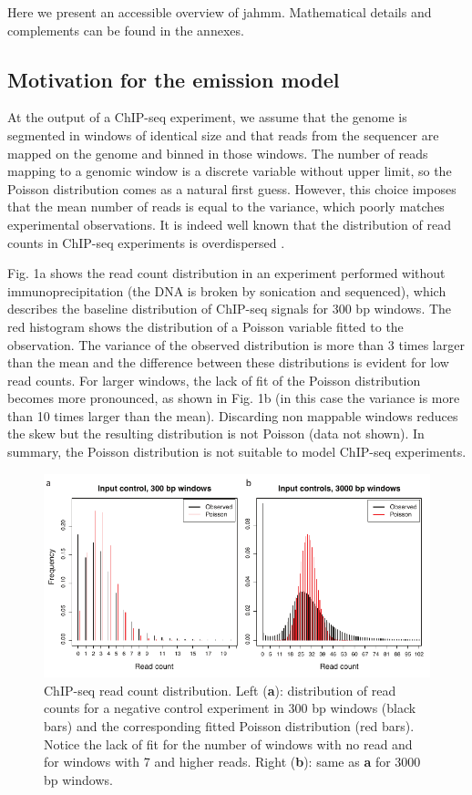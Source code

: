 \documentclass[12pt]{article}
\begin{document}
Here we present an accessible overview of jahmm. Mathematical details and complements can be found in the annexes.

\subsection{Motivation for the emission model}

At the output of a ChIP-seq experiment, we assume that the genome is segmented in windows of identical size and that reads from the sequencer are mapped on the genome and binned in those windows. The number of reads mapping to a genomic window is a discrete variable without upper limit, so the Poisson distribution comes as a natural first guess. However, this choice imposes that the mean number of reads is equal to the variance, which poorly matches experimental observations. It is indeed well known that the distribution of read counts in ChIP-seq experiments is overdispersed \cite{pmid19772557,pmid20598134}.

Fig. 1a shows  the read count distribution in an experiment performed without immunoprecipitation (the DNA is broken by sonication and sequenced), which describes the baseline distribution of ChIP-seq signals for 300 bp windows. The red histogram shows the distribution of a Poisson variable fitted to the observation. The variance of the observed distribution is more than 3 times larger than the mean and the difference between these distributions is evident for low read counts. For larger windows, the lack of fit of the Poisson distribution becomes more pronounced, as shown in Fig. 1b (in this case the variance is more than 10 times larger than the mean). Discarding non mappable windows reduces the skew but the resulting distribution is not Poisson (data not shown). In summary, the Poisson distribution is not suitable to model ChIP-seq experiments.

\begin{figure}
  \includegraphics[width=\textwidth]{Fig1.pdf}
  \caption{ChIP-seq read count distribution.
  Left (\textbf{a}): distribution of read counts for a negative control
  experiment in 300 bp windows (black bars) and the corresponding fitted
  Poisson distribution (red bars). Notice the lack of fit for the number
  of windows with no read and for windows with 7 and higher reads.
  Right (\textbf{b}): same as \textbf{a} for 3000 bp windows.}
\end{figure}
\end{document}
